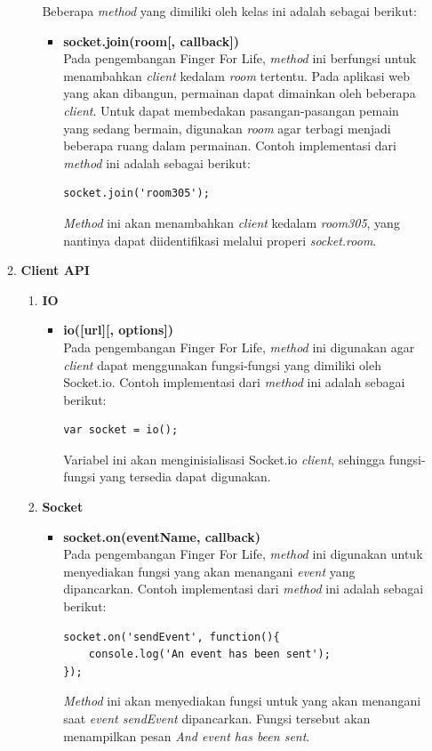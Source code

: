 \begin{enumerate}
\begin{enumerate}
\begin{enumerate}
\begin{itemize}
			\end{itemize}
		
			Beberapa \textit{method} yang dimiliki oleh kelas ini adalah sebagai berikut:
			\begin{itemize}
				\item \textbf{socket.join(room[, callback])} \\
				Pada pengembangan Finger For Life, \textit{method} ini berfungsi untuk menambahkan \textit{client} kedalam \textit{room} tertentu. Pada aplikasi web yang akan dibangun, permainan dapat dimainkan oleh beberapa \textit{client}. Untuk dapat membedakan pasangan-pasangan pemain yang sedang bermain, digunakan \textit{room} agar terbagi menjadi beberapa ruang dalam permainan. Contoh implementasi dari \textit{method} ini adalah sebagai berikut:
\begin{lstlisting}
socket.join('room305');
\end{lstlisting}
				\textit{Method} ini akan menambahkan \textit{client} kedalam \textit{room305}, yang nantinya dapat diidentifikasi melalui properi \textit{socket.room}.

			\end{itemize}
		\end{enumerate}
	
		
		\item \textbf{Client API} \\
		\begin{enumerate}
			\item \textbf{IO}
			\begin{itemize}
				\item \textbf{io([url][, options])} \\
				Pada pengembangan Finger For Life, \textit{method} ini digunakan agar \textit{client} dapat menggunakan fungsi-fungsi yang dimiliki oleh Socket.io. Contoh implementasi dari \textit{method} ini adalah sebagai berikut:
\begin{lstlisting}
var socket = io();
\end{lstlisting}
				Variabel ini akan menginisialisasi Socket.io \textit{client}, sehingga fungsi-fungsi yang tersedia dapat digunakan.

			\end{itemize}
		
			\item \textbf{Socket}
			\begin{itemize}
				\item \textbf{socket.on(eventName, callback)} \\
				Pada pengembangan Finger For Life, \textit{method} ini digunakan untuk menyediakan fungsi yang akan menangani \textit{event} yang dipancarkan. Contoh implementasi dari \textit{method} ini adalah sebagai berikut:
\begin{lstlisting}
socket.on('sendEvent', function(){
	console.log('An event has been sent');
});
\end{lstlisting}
\textit{Method} ini akan menyediakan fungsi untuk yang akan menangani saat \textit{event sendEvent} dipancarkan. Fungsi tersebut akan menampilkan pesan \textit{And event has been sent}.
				

\end{itemize}
\end{enumerate}
\end{enumerate}
\end{enumerate}

